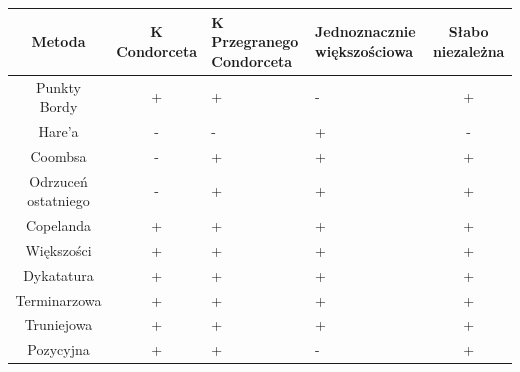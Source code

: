 \documentclass[12pt,a4paper]{article}
\theoremstyle{break}
\begin{document}
	\begin{tabular}{|c|c|p{3cm}|p{3cm}|c|}\hline
		Metoda &K Condorceta& K Przegranego Condorceta&Jednoznacznie większościowa&Słabo niezależna\\\hline
		Punkty Bordy   &+&+&-&+\\\hline
		Hare'a   &-&-&+&-\\\hline
		Coombsa &-&+&+&+\\\hline
		Odrzuceń ostatniego &-&+&+&+\\\hline
		Copelanda &+&+&+&+\\\hline
		Większości &+&+&+&+\\\hline
		Dykatatura &+&+&+&+\\\hline
		Terminarzowa &+&+&+&+\\\hline
		Truniejowa &+&+&+&+\\\hline
		Pozycyjna &+&+&-&+\\\hline
	\end{tabular}\\
	
	
		
	\begin{center}
		 {\fontsize{30}{36}\selectfont\faBirthdayCake}
	\end{center}
	

	
	
\end{document}
